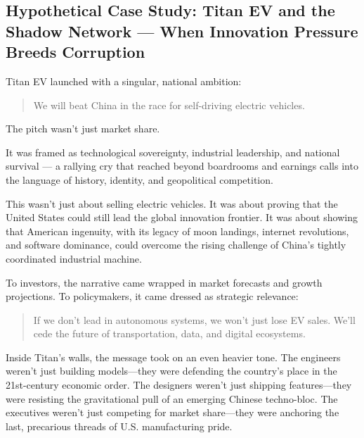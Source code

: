 \subsection{Hypothetical Case Study: Titan EV and the Shadow Network — When Innovation Pressure Breeds Corruption}

Titan EV launched with a singular, national ambition:
\begin{quote}
We will beat China in the race for self-driving electric vehicles.
\end{quote}

The pitch wasn’t just market share.

It was framed as technological sovereignty, industrial leadership, and national survival — a rallying cry that reached beyond boardrooms and earnings calls into the language of history, identity, and geopolitical competition.

This wasn’t just about selling electric vehicles.
It was about proving that the United States could still lead the global innovation frontier.
It was about showing that American ingenuity, with its legacy of moon landings, internet revolutions, and software dominance, could overcome the rising challenge of China’s tightly coordinated industrial machine.

To investors, the narrative came wrapped in market forecasts and growth projections.
To policymakers, it came dressed as strategic relevance:
\begin{quote}
If we don’t lead in autonomous systems, we won’t just lose EV sales.
We’ll cede the future of transportation, data, and digital ecosystems.
\end{quote}

Inside Titan’s walls, the message took on an even heavier tone.
The engineers weren’t just building models—they were defending the country’s place in the 21st-century economic order.
The designers weren’t just shipping features—they were resisting the gravitational pull of an emerging Chinese techno-bloc.
The executives weren’t just competing for market share—they were anchoring the last, precarious threads of U.S. manufacturing pride.

\medskip

